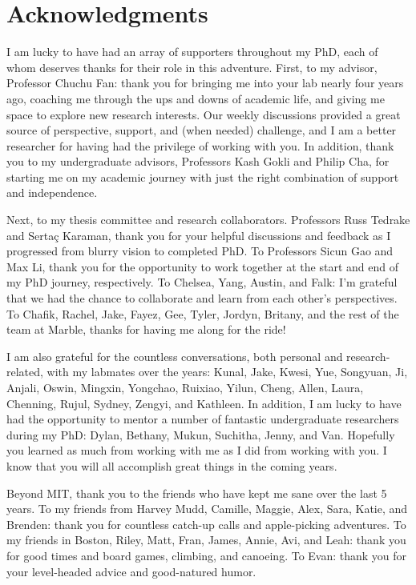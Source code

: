 


\chapter*{Acknowledgments}

I am lucky to have had an array of supporters throughout my PhD, each of whom deserves thanks for their role in this adventure. First, to my advisor, Professor Chuchu Fan: thank you for bringing me into your lab nearly four years ago, coaching me through the ups and downs of academic life, and giving me space to explore new research interests. Our weekly discussions provided a great source of perspective, support, and (when needed) challenge, and I am a better researcher for having had the privilege of working with you. In addition, thank you to my undergraduate advisors, Professors Kash Gokli and Philip Cha, for starting me on my academic journey with just the right combination of support and independence.

Next, to my thesis committee and research collaborators. Professors Russ Tedrake and Serta\c c Karaman, thank you for your helpful discussions and feedback as I progressed from blurry vision to completed PhD. To Professors Sicun Gao and Max Li, thank you for the opportunity to work together at the start and end of my PhD journey, respectively. To Chelsea, Yang, Austin, and Falk: I'm grateful that we had the chance to collaborate and learn from each other's perspectives. To Chafik, Rachel, Jake, Fayez, Gee, Tyler, Jordyn, Britany, and the rest of the team at Marble, thanks for having me along for the ride!

I am also grateful for the countless conversations, both personal and research-related, with my labmates over the years: Kunal, Jake, Kwesi, Yue, Songyuan, Ji, Anjali, Oswin, Mingxin, Yongchao, Ruixiao, Yilun, Cheng, Allen, Laura, Chenning, Rujul, Sydney, Zengyi, and Kathleen. In addition, I am lucky to have had the opportunity to mentor a number of fantastic undergraduate researchers during my PhD: Dylan, Bethany, Mukun, Suchitha, Jenny, and Van. Hopefully you learned as much from working with me as I did from working with you. I know that you will all accomplish great things in the coming years.

Beyond MIT, thank you to the friends who have kept me sane over the last 5 years. To my friends from Harvey Mudd, Camille, Maggie, Alex, Sara, Katie, and Brenden: thank you for countless catch-up calls and apple-picking adventures. To my friends in Boston, Riley, Matt, Fran, James, Annie, Avi, and Leah: thank you for good times and board games, climbing, and canoeing. To Evan: thank you for your level-headed advice and good-natured humor.

